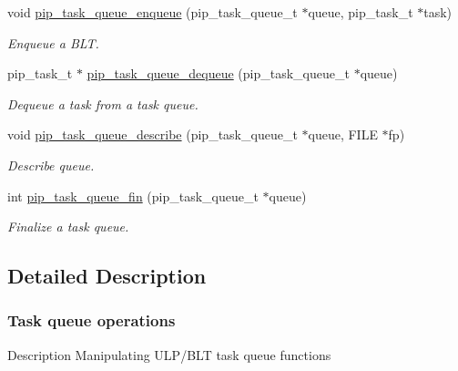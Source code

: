 \documentclass[twoside]{book}
\begin{document}
\begin{DoxyCompactItemize}
void \hyperlink{group__ulp-1-task-queue_gae0f80336f51c43c3da988dd0467453cf}{pip\-\_\-task\-\_\-queue\-\_\-enqueue} (pip\-\_\-task\-\_\-queue\-\_\-t $\ast$queue, pip\-\_\-task\-\_\-t $\ast$task)
\begin{DoxyCompactList}\small\item\em Enqueue a B\-L\-T. \end{DoxyCompactList}\item 
pip\-\_\-task\-\_\-t $\ast$ \hyperlink{group__ulp-1-task-queue_ga943bace202c72533951df9fc43f62277}{pip\-\_\-task\-\_\-queue\-\_\-dequeue} (pip\-\_\-task\-\_\-queue\-\_\-t $\ast$queue)
\begin{DoxyCompactList}\small\item\em Dequeue a task from a task queue. \end{DoxyCompactList}\item 
void \hyperlink{group__ulp-1-task-queue_ga7fdea4628abd0c38779276b6cd8ebd3f}{pip\-\_\-task\-\_\-queue\-\_\-describe} (pip\-\_\-task\-\_\-queue\-\_\-t $\ast$queue, F\-I\-L\-E $\ast$fp)
\begin{DoxyCompactList}\small\item\em Describe queue. \end{DoxyCompactList}\item 
int \hyperlink{group__ulp-1-task-queue_ga45d0eaa7122e459ea19187c148b9da10}{pip\-\_\-task\-\_\-queue\-\_\-fin} (pip\-\_\-task\-\_\-queue\-\_\-t $\ast$queue)
\begin{DoxyCompactList}\small\item\em Finalize a task queue. \end{DoxyCompactList}\end{DoxyCompactItemize}


\subsection{Detailed Description}
\hypertarget{ulp-task-queue}{}\subsubsection{Task queue operations}\label{ulp-task-queue}
\begin{DoxyParagraph}{Description}
Manipulating U\-L\-P/\-B\-L\-T task queue functions 
\end{DoxyParagraph}
\end{document}
